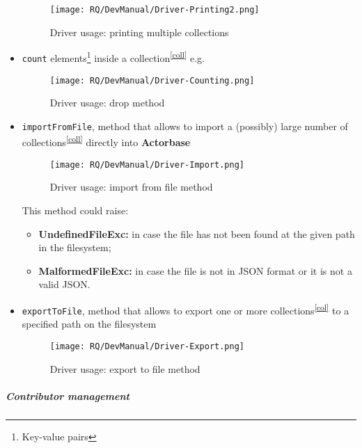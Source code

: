 \documentclass{scalatekids-article}
\begin{document}
\begin{itemize}
\begin{figure}[H]
    \begin{center}
      \texttt{[image: RQ/DevManual/Driver-Printing2.png]}
      \caption{Driver usage: printing multiple collections}
    \end{center}
  \end{figure}
\item \verb=count= elements\footnote{Key-value pairs} inside a collection\textsuperscript{\ref{coll}} e.g.
  \begin{figure}[H]
    \begin{center}
      \texttt{[image: RQ/DevManual/Driver-Counting.png]}
      \caption{Driver usage: drop method}
    \end{center}
  \end{figure}
\item \verb=importFromFile=, method that allows to import a (possibly) large number of collections\textsuperscript{\ref{coll}}
  directly into \textbf{Actorbase}
  \begin{figure}[H]
    \begin{center}
      \texttt{[image: RQ/DevManual/Driver-Import.png]}
      \caption{Driver usage: import from file method}
    \end{center}
  \end{figure}
  This method could raise:
  \begin{itemize}
  \item \textbf{UndefinedFileExc:} in case the file has not been found at the given path in the filesystem;
  \item \textbf{MalformedFileExc:} in case the file is not in JSON format or it is not a valid JSON.
  \end{itemize}

\item \verb=exportToFile=, method that allows to export one or more collections\textsuperscript{\ref{col}} to a specified path on the filesystem
  \begin{figure}[H]
    \begin{center}
      \texttt{[image: RQ/DevManual/Driver-Export.png]}
      \caption{Driver usage: export to file method}
    \end{center}
  \end{figure}
\end{itemize}

\subparagraph{Contributor management}
\end{document}
